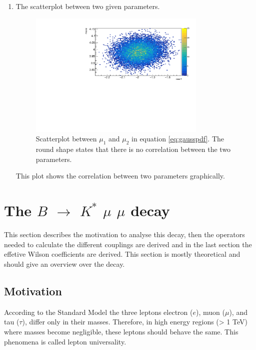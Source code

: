 \documentclass[english]{uzhpub}
\begin{document}
\begin{enumerate}
  \item The scatterplot between two given parameters.
  \begin{figure}[H]
    \centering
    \includegraphics[width=0.8\textwidth]{RooMCMC/scatter}
    \caption{Scatterplot between $\mu_1$ and $\mu_2$ in equation \ref{eq:gausspdf}. The round shape states that there is no correlation between the two parameters.}
    \label{fig:scatter}
  \end{figure}
  This plot shows the correlation between two parameters graphically.
\end{enumerate}


\section{The $B$ $\rightarrow$ $K^{*}$ $\mu$ $\mu$ decay}

This section describes the motivation to analyse this decay, then the operators needed to calculate the different couplings are derived and in the last section the effetive Wilson coefficients are derived. This section is mostly theoretical and should give an overview over the decay.

\subsection{Motivation} \label{sec:Motivation}
According to the Standard Model the three leptons electron ($e$), muon ($\mu$), and  tau ($\tau$),  differ only in their masses. Therefore, in high energy regions (> 1 TeV) where masses become negligible, these leptons should behave the same. This phenomena is called lepton universality.
\end{document}
